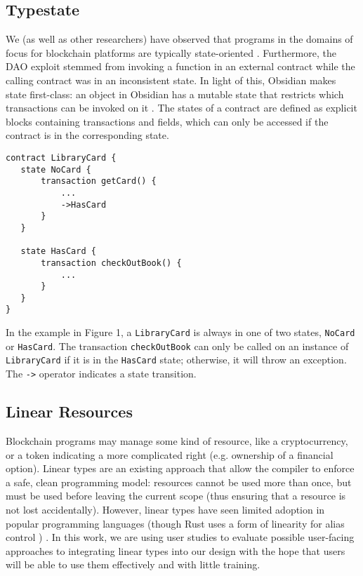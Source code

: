 \documentclass[sigplan,10pt,review]{acmart}\settopmatter{printfolios=true}
\begin{document}
\subsection{Typestate}

We (as well as other researchers) have observed that programs in the domains of focus for blockchain platforms are typically state-oriented \cite{State}. Furthermore, the DAO exploit stemmed from invoking a function in an external contract while the calling contract was in an inconsistent state.
In light of this, Obsidian makes state first-class: an object in Obsidian has a mutable state that restricts which 
transactions can be invoked on it \cite{Aldrich}. The states of a contract are defined as explicit blocks containing 
transactions and fields, which can only be accessed if the contract is in the corresponding state. 

\begin{lstlisting}[caption={An example of states in Obsidian.},captionpos=b]
contract LibraryCard {
   state NoCard {
       transaction getCard() {
           ...
           ->HasCard
       }
   }
  
   state HasCard {
       transaction checkOutBook() {
           ...
       }
   }
}
\end{lstlisting}

In the example in Figure 1,  a \texttt{\small{LibraryCard}} is always in one of two
states, \texttt{\small{NoCard}} or \texttt{\small{HasCard}}. The transaction 
\texttt{\small{checkOutBook}} can only be called on an instance of 
\texttt{\small{LibraryCard}} if it is in the \texttt{\small{HasCard}} state; otherwise, it will throw an exception. 
The \texttt{\small{->}} operator indicates a state transition.

\subsection{Linear Resources}

Blockchain programs may manage some kind of resource, like a cryptocurrency, or a token 
indicating a more complicated right (e.g. ownership of a financial option). Linear types \cite{Wadler} are an existing approach that allow the compiler to
enforce a safe, clean programming model: resources cannot be used more than once, but must be 
used before leaving the current scope (thus ensuring that a resource is not lost accidentally). However, linear types have seen limited adoption in popular programming languages (though Rust uses a form of linearity for alias control \cite{Rust}) . In this work, we are using user studies to evaluate possible user-facing approaches to integrating linear types into our design with the hope that users will be able to use them effectively and with little training.
\end{document}
